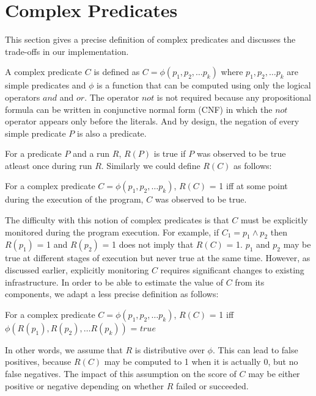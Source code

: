 \section{Complex Predicates}
\label{sec-complex-preds}
This section gives a precise definition of complex predicates and discusses the trade-offs in our implementation.

A complex predicate $C$ is defined as $C = \phi(p_1, p_2, \ldots p_k)$ where $p_1, p_2, \ldots p_k$ are simple predicates and $\phi$ is a function that can be computed using only the logical operators $and$ and $or$.  The operator $not$ is not required because any propositional formula can be written in conjunctive normal form (CNF) in which the $not$ operator appears only before the literals.  And by design, the negation of every simple predicate $P$ is also a predicate.

For a predicate $P$ and a run $R$, $R(P)$ is true if $P$ was observed to be true atleast once during run $R$.  Similarly we could define $R(C)$ as follows:
\begin{defn}
\label{dfn1}
For a complex predicate $C = \phi(p_1, p_2, \ldots p_k)$, $R(C)$ = 1 iff at some point during the execution of the program, $C$ was observed to be true.
\end{defn}

The difficulty with this notion of complex predicates is that $C$ must be explicitly monitored during the program execution.  For example, if $C_1 = p_1 \wedge p_2$ then $R(p_1)$ = 1 and $R(p_2)$ = 1 does not imply that $R(C)$ = 1.  $p_1$ and $p_2$ may be true at different stages of execution but never true at the same time.  However, as discussed earlier, explicitly monitoring $C$ requires significant changes to existing infrastructure.  In order to be able to estimate the value of $C$ from its components, we adapt a less precise definition as follows:
\begin{defn}
\label{dfn2}
For a complex predicate $C = \phi(p_1, p_2, \ldots p_k)$, $R(C)$ = 1 iff $\phi(R(p_1), R(p_2), \ldots R(p_k))$ = $true$
\end{defn}

In other words, we assume that $R$ is distributive over $\phi$.  This can lead to false positives, because $R(C)$ may be computed to 1 when it is actually 0, but no false negatives.  The impact of this assumption on the score of $C$ may be either positive or negative depending on whether $R$ failed or succeeded.

